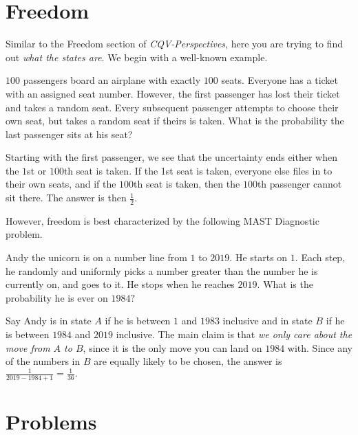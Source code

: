\documentclass[mast]{lucky}
\begin{document}
\section{Freedom}

Similar to the Freedom section of \emph{CQV-Perspectives}, here you are trying to find out \textit{what the states are}. We begin with a well-known example.

\begin{exam}
$100$ passengers board an airplane with exactly $100$ seats. Everyone has a ticket with an assigned seat number. However, the first passenger has lost their ticket and takes a random seat. Every subsequent passenger attempts to choose their own seat, but takes a random seat if theirs is taken. What is the probability the last passenger sits at his seat?
\end{exam}

\begin{sol}
Starting with the first passenger, we see that the uncertainty ends either when the $1$st or $100$th seat is taken. If the 1st seat is taken, everyone else files in to their own seats, and if the $100$th seat is taken, then the $100$th passenger cannot sit there. The answer is then $\frac{1}{2}.$
\end{sol}

However, freedom is best characterized by the following MAST Diagnostic problem.

\begin{exam}
Andy the unicorn is on a number line from $1$ to $2019.$ He starts on $1.$ Each step, he randomly and uniformly picks a number greater than the number he is currently on, and goes to it. He stops when he reaches $2019.$ What is the probability he is ever on $1984?$
\end{exam}

\begin{sol}
Say Andy is in state $A$ if he is between $1$ and $1983$ inclusive and in state $B$ if he is between $1984$ and $2019$ inclusive. The main claim is that \emph{we only care about the move from $A$ to $B$}, since it is the only move you can land on $1984$ with. Since any of the numbers in $B$ are equally likely to be chosen, the answer is $\frac{1}{2019-1984+1}=\frac{1}{36}.$
\end{sol}

\pagebreak

\section{Problems}
\end{document}
